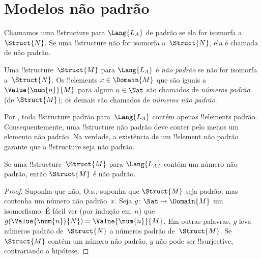 \documentclass[../../../include/open-logic-section]{subfiles}
\begin{document}
\section{Modelos não padrão}

\begin{explain}
Chamamos uma !!{structure} para $\Lang{L_A}$ de padrão se ela for
isomorfa a~$\Struct{N}$. Se uma !!{structure} não for isomorfa
a~$\Struct{N}$, ela é chamada de não padrão.
\end{explain}

\begin{defn}
Uma !!{structure}~$\Struct{M}$ para $\Lang{L_A}$ é \emph{não padrão}
se não for isomorfa a~$\Struct{N}$. Os !!{element}s $x \in
\Domain{M}$ que são iguais a $\Value{\num{n}}{M}$ para algum $n \in
\Nat$ são chamados de \emph{números padrão} (de $\Struct{M}$); os
demais são chamados de \emph{números não padrão}.
\end{defn}

\begin{explain}
Por , toda !!{structure} padrão
para~$\Lang{L_A}$ contém apenas !!{element}s padrão. Consequentemente,
uma !!{structure} não padrão deve conter pelo menos um elemento não
padrão. Na verdade, a existência de um !!{element} não padrão garante
que a !!{structure} seja não padrão.
\end{explain}

\begin{prop}
Se uma !!{structure}~$\Struct{M}$ para $\Lang{L_A}$ contém um número
não padrão, então $\Struct{M}$ é não padrão.
\end{prop}

\begin{proof}
Suponha que não, O.s.\@, suponha que $\Struct{M}$ seja padrão, mas
contenha um número não padrão~$x$. Seja $g\colon \Nat \to \Domain{M}$
um isomorfismo. É fácil ver (por indução em~$n$) que
$g(\Value{\num{n}}{N}) = \Value{\num{n}}{M}$. Em outras palavras, $g$
leva números padrão de~$\Struct{N}$ a números padrão
de~$\Struct{M}$. Se $\Struct{M}$ contém um número não padrão, $g$ não
pode ser !!{surjective}, contrariando a hipótese.
\end{proof}
\end{document}
